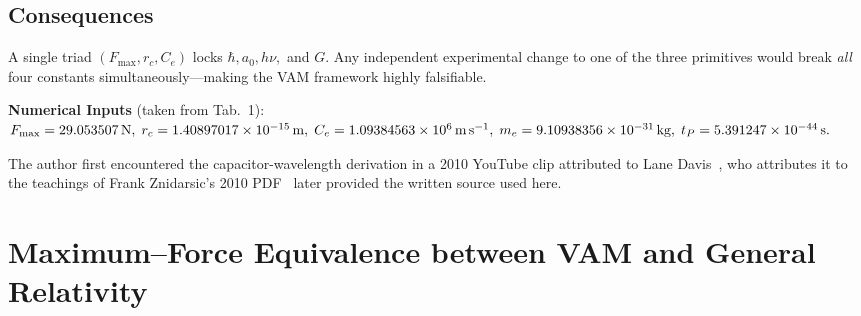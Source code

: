 \documentclass[a4paper,12pt]{article}
\begin{document}
    \subsection*{Consequences}
    A single triad \((F_{\max},r_c,C_e)\)
    locks \(\hbar,a_0,h\nu,\) and \(G\).
    Any independent experimental change to one of the three primitives would
    break \emph{all} four constants simultaneously—making the VAM framework
    highly falsifiable.

    \bigskip
    \noindent\textbf{Numerical Inputs}\; (taken from Tab.~1):
    \(F_{\max}=29.053507\,\text{N},\;r_c=1.40897017\times10^{-15}\,\text{m},\;
    C_e=1.09384563\times10^{6}\,\text{m\,s}^{-1},\;
    m_e=9.10938356\times10^{-31}\,\text{kg},\;
    t_P=5.391247\times10^{-44}\,\text{s}.\)



    The author first encountered the capacitor-wavelength derivation in a 2010 YouTube clip attributed to Lane Davis~\cite{davis2010_video}, who attributes it to the teachings of Frank Znidarsic's 2010 PDF~\cite{znidarsic2010} later provided the written source used here.


\section{Maximum–Force Equivalence between VAM and General Relativity}
\label{sec:maxforce-equivalence}
\end{document}
